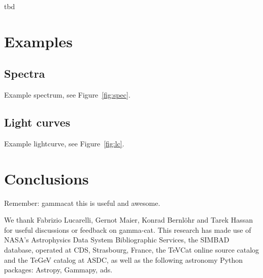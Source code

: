 \documentclass[11pt,twoside]{article}
\begin{document}
tbd

\section{Examples}

\subsection{Spectra}

Example spectrum, see Figure~\ref{fig:spec}.


\subsection{Light curves}

Example lightcurve, see Figure~\ref{fig:lc}.


\section{Conclusions}

Remember: gammacat this is useful and awesome.

\clearpage %

\acknowledgements We thank Fabrizio Lucarelli, Gernot Maier, Konrad Bernl\"ohr and Tarek Hassan for useful discussions or feedback on gamma-cat.
This research has made use of NASA's Astrophysics Data System Bibliographic Services, the SIMBAD database, operated at CDS, Strasbourg, France, the TeVCat online source catalog and the TeGeV catalog at ASDC, as well as the following astronomy Python packages: Astropy, Gammapy, ads.


\end{document}
